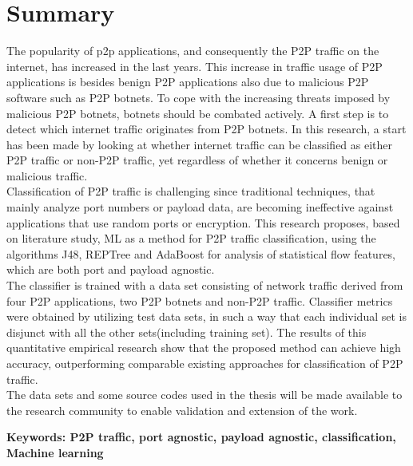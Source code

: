 \chapter{Summary}
\ifpdf
    \graphicspath{{Summary/Figs/Raster/}{Summary/Figs/PDF/}{Summary/Figs/}}
\else
    \graphicspath{{Summary/Figs/Vector/}{Summary/Figs/}}
\fi

The popularity of \gls{p2p} applications, and consequently the P2P traffic on the internet, has increased in the last years.
This increase in traffic usage of P2P applications is besides benign P2P applications also due to malicious P2P software such as P2P botnets.
To cope with the increasing threats imposed by malicious P2P botnets, botnets should be combated actively. A first step is to  detect which internet traffic originates from P2P \glspl{botnet}.
In this research, a start has been made by looking at whether internet traffic can be classified as either P2P traffic or non-P2P traffic, yet regardless of whether it concerns benign or malicious traffic.\\

\noindent
Classification of P2P traffic is challenging since traditional techniques, that mainly analyze port numbers or payload data, are becoming ineffective against applications that use random ports or encryption.
This research proposes, based on literature study, \gls{ML} as a method for P2P traffic classification, using the algorithms J48, REPTree and AdaBoost for analysis of statistical flow features, which are both port and payload agnostic.\\

\noindent
The classifier is trained with a data set consisting of network traffic derived from four P2P applications, two P2P botnets and non-P2P traffic.
Classifier metrics were obtained by utilizing test data sets, in such a way that each individual set is disjunct with all the other sets(including training set). 
The results of this quantitative empirical research show that the proposed method can achieve high accuracy, outperforming comparable existing approaches for classification of P2P traffic.
\\

\noindent
The data sets and some source codes used in the thesis will be made available to the research
community to enable validation and extension of the work.

\vspace{2cm}

\noindent
\textbf{Keywords: P2P traffic, port agnostic, payload agnostic, classification, Machine learning}
